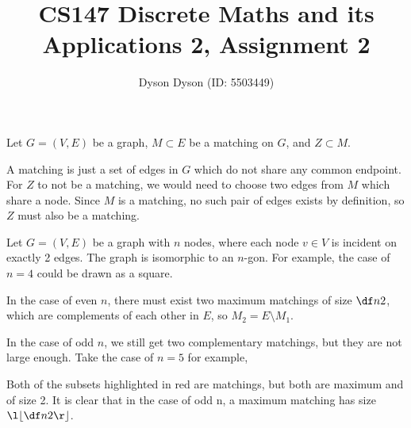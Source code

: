 \documentclass[a4paper]{article}
\title{CS147 Discrete Maths and its Applications 2, Assignment 2}
\author{Dyson Dyson (ID: 5503449)}
\date{}
\begin{document}
\maketitle

\setlength{\parindent}{0em}
\setlength{\parskip}{1em}


Let $G = (V, E)$ be a graph, $M \subset E$ be a matching on $G$, and $Z \subset M$.

A matching is just a set of edges in $G$ which do not share any common endpoint. For $Z$ to not be a matching, we would need to choose two edges from $M$ which share a node. Since $M$ is a matching, no such pair of edges exists by definition, so $Z$ must also be a matching.



Let $G = (V, E)$ be a graph with $n$ nodes, where each node $v \in V$ is incident on exactly 2 edges.
The graph is isomorphic to an $n$-gon. For example, the case of $n=4$ could be drawn as a square.

In the case of even $n$, there must exist two maximum matchings of size $\df n2$, which are complements of each other in $E$, so $M_2 = E \setminus M_1$.

In the case of odd $n$, we still get two complementary matchings, but they are not large enough. Take the case of $n=5$ for example,

\begin{center}
\end{center}

Both of the subsets highlighted in red are matchings, but both are maximum and of size 2. It is clear that in the case of odd n, a maximum matching has size $\l\lfloor \df n2 \r\rfloor$.
\end{document}
